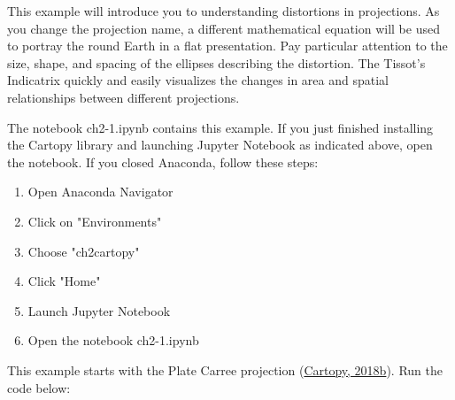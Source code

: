 \documentclass[a4paper , 12pt]{book}
\begin{document}
This example will introduce you to understanding distortions in projections. As you change the projection name, a different mathematical equation will be used to portray the round Earth in a flat presentation. Pay particular attention to the size, shape, and spacing of the ellipses describing the distortion. The Tissot’s Indicatrix quickly and easily visualizes the changes in area and spatial relationships between different projections.

The notebook ch2-1.ipynb contains this example. If you just finished installing the Cartopy library and launching Jupyter Notebook as indicated above, open the notebook. If you closed Anaconda, follow these steps:

\begin{enumerate}
    \item Open Anaconda Navigator
    \item Click on "Environments"
    \item Choose "ch2cartopy"
    \item Click "Home"
    \item Launch Jupyter Notebook
    \item Open the notebook ch2-1.ipynb
\end{enumerate}{}

This example starts with the Plate Carree projection (\href{https://scitools.org.uk/cartopy/docs/latest/gallery/tissot.html}{Cartopy, 2018b}). Run the code below:
\end{document}
